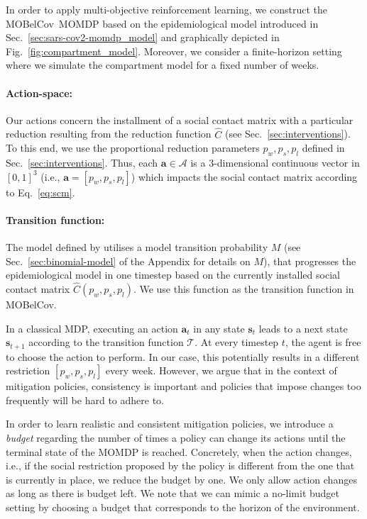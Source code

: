 \documentclass{article}
\newcommand{\mdpactionspace}{\mathcal{A}}
\newcommand{\mdptransition}{\mathcal{T}}
\newcommand{\mdpstate}{\mathbf{s}}
\newcommand{\mdpaction}{\mathbf{a}}
\newcommand{\momdpname}{MOBelCov}
\begin{document}
In order to apply multi-objective reinforcement learning, we construct the \momdpname\ MOMDP based on the epidemiological model introduced in Sec.~\ref{sec:sars-cov2-momdp_model} and graphically depicted in Fig.~\ref{fig:compartment_model}. Moreover, we consider a finite-horizon setting where we simulate the compartment model for a fixed number of weeks.

\paragraph{Action-space:} Our actions concern the installment of a social contact matrix with a particular reduction resulting from the reduction function $\hat{C}$ (see Sec.~\ref{sec:interventions}). To this end, we use the proportional reduction parameters $p_w, p_s, p_l$ defined in Sec.~\ref{sec:interventions}. Thus, each $\mdpaction \in \mdpactionspace$ is a 3-dimensional continuous vector in $[0,1]^3$ (i.e., $\mdpaction = [p_{w}, p_{s}, p_{l}]$) which impacts the social contact matrix according to Eq.~\ref{eq:scm}.

\paragraph{Transition function:} The model defined by \citet{abrams2021modelling} utilises a model transition probability $M$ (see Sec.~\ref{sec:binomial-model} of the Appendix for details on $M$), that progresses the epidemiological model in one timestep based on the currently installed social contact matrix $\hat{C}(p_{w}, p_{s}, p_{l})$.
We use this function as the transition function in \momdpname.

In a classical MDP, executing an action $\mdpaction_t$ in any state $\mdpstate_t$ leads to a next state $\mdpstate_{t+1}$ according to the transition function $\mdptransition$. At every timestep $t$, the agent is free to choose the action to perform. In our case, this potentially results in a different restriction $[p_{w}, p_{s}, p_{l}]$ every week. However, we argue that in the context of mitigation policies, consistency is important and policies that impose changes too frequently will be hard to adhere to.

In order to learn realistic and consistent mitigation policies, we introduce a \emph{budget} regarding the number of times a policy can change its actions until the terminal state of the MOMDP is reached. Concretely, when the action changes, i.e., if the social restriction proposed by the policy is different from the one that is currently in place, we reduce the budget by one. We only allow action changes as long as there is budget left. We note that we can mimic a no-limit budget setting by choosing a budget that corresponds to the horizon of the environment.
\end{document}
